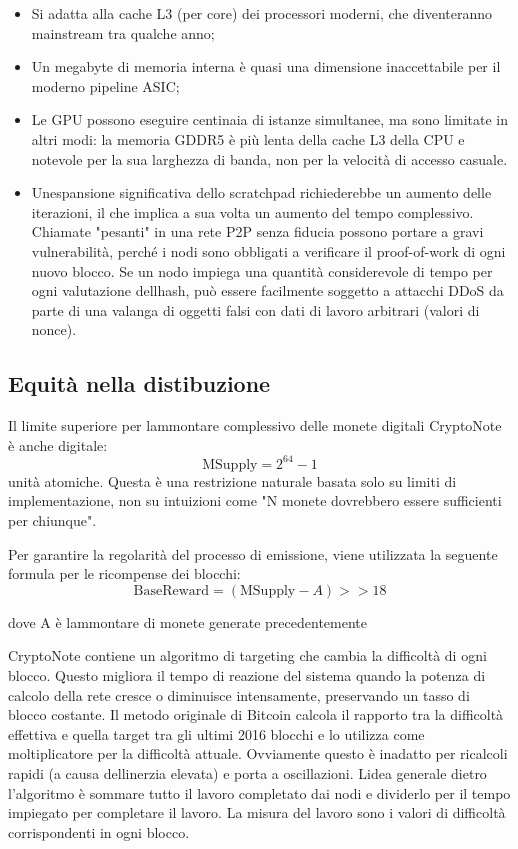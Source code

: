 \documentclass[
]{article}
\begin{document}
\begin{itemize}
\item
  Si adatta alla cache L3 (per core) dei processori moderni, che
  diventeranno mainstream tra qualche anno;
\item
  Un megabyte di memoria interna è quasi una dimensione inaccettabile
  per il moderno pipeline ASIC;
\item
  Le GPU possono eseguire centinaia di istanze simultanee, ma sono
  limitate in altri modi: la memoria GDDR5 è più lenta della cache L3
  della CPU e notevole per la sua larghezza di banda, non per la
  velocità di accesso casuale.
\item
  Un\textquotesingle espansione significativa dello scratchpad
  richiederebbe un aumento delle iterazioni, il che implica a sua volta
  un aumento del tempo complessivo. Chiamate "pesanti" in una rete P2P
  senza fiducia possono portare a gravi vulnerabilità, perché i nodi
  sono obbligati a verificare il proof-of-work di ogni nuovo blocco. Se
  un nodo impiega una quantità considerevole di tempo per ogni
  valutazione dell\textquotesingle hash, può essere facilmente soggetto
  a attacchi DDoS da parte di una valanga di oggetti falsi con dati di
  lavoro arbitrari (valori di nonce).
\end{itemize}

\subsection{Equità nella
distibuzione}\label{equituxe0-nella-distibuzione}

Il limite superiore per l\textquotesingle ammontare complessivo delle
monete digitali CryptoNote è anche digitale:
\[\text{MSupply} = 2^{64} - 1\] unità atomiche. Questa è una restrizione
naturale basata solo su limiti di implementazione, non su intuizioni
come "N monete dovrebbero essere sufficienti per chiunque".

Per garantire la regolarità del processo di emissione, viene utilizzata
la seguente formula per le ricompense dei blocchi: \[
\text{BaseReward} = (\text{MSupply} - A) >> 18 \]

dove A è l\textquotesingle ammontare di monete generate precedentemente

CryptoNote contiene un algoritmo di targeting che cambia la difficoltà
di ogni blocco. Questo migliora il tempo di reazione del sistema quando
la potenza di calcolo della rete cresce o diminuisce intensamente,
preservando un tasso di blocco costante. Il metodo originale di Bitcoin
calcola il rapporto tra la difficoltà effettiva e quella target tra gli
ultimi 2016 blocchi e lo utilizza come moltiplicatore per la difficoltà
attuale. Ovviamente questo è inadatto per ricalcoli rapidi (a causa
dell\textquotesingle inerzia elevata) e porta a oscillazioni.
L\textquotesingle idea generale dietro l'algoritmo è sommare tutto il
lavoro completato dai nodi e dividerlo per il tempo impiegato per
completare il lavoro. La misura del lavoro sono i valori di difficoltà
corrispondenti in ogni blocco.
\end{document}
